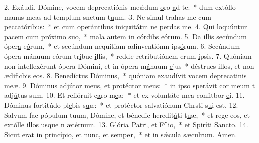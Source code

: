 2. Exáudi, Dómine, vocem deprecatiónis meǽdum \uline{o}ro \uline{a}d te:~* dum extóllo manus meas ad templum snctum t\uline{u}um.
3. Ne simul trahas me cum p\uline{e}ccat\uline{ó}ribus:~* et cum operántibus iniquitátm ne p\uline{e}rdas me.
4. Qui loquúntur pacem cum pr\uline{ó}ximo s\uline{u}o,~* mala autem in córdibs e\uline{ó}rum.
5. Da illis secúndum óper\uline{a} e\uline{ó}rum,~* et secúndum nequítiam adinventiónm ips\uline{ó}rum.
6. Secúndum ópera mánuum eórum tr\uline{í}bue \uline{i}llis,~* redde retributiónem erum \uline{i}psis.
7. Quóniam non intellexérunt ópera Dómini, et in ópera m\uline{á}nuum \uline{e}jus~* déstrues illos, et non ædificbis \uline{e}os.
8. Bened\uline{í}ctus D\uline{ó}minus,~* quóniam exaudívit vocem deprecatinis m\uline{e}æ.
9. Dóminus adjútor meus, et prot\uline{é}ctor m\uline{e}us:~* in ipso sperávit cor meum t adj\uline{ú}tus sum.
10. Et reflóruit c\uline{a}ro m\uline{e}a:~* et ex voluntáte mea confitbor \uline{e}i.
11. Dóminus fortitúdo pl\uline{e}bis s\uline{u}æ:~* et protéctor salvatiónum Chrsti s\uline{u}i est.
12. Salvum fac pópulum tuum, Dómine, et bénedic heredit\uline{á}ti t\uline{u}æ,~* et rege eos, et extólle illos usque n æt\uline{é}rnum.
13. Glória P\uline{a}tri, et F\uline{í}lio,~* et Spiríti S\uline{a}ncto.
14. Sicut erat in princípio, et n\uline{u}nc, et s\uline{e}mper,~* et in sǽcula sæculrum. \uline{A}men.

